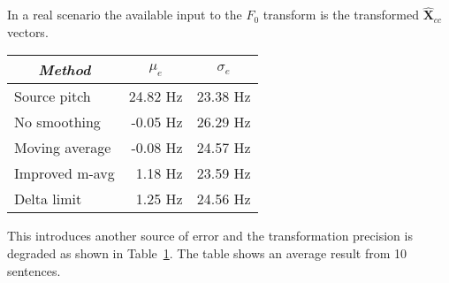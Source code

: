 In a real scenario the available input to the $F_0$ transform is the transformed $\mathbf{\hat{X}}_{cc}$ vectors. 
\begin{table}[htbp]
	\begin{center}
		\label{tab:pitch_pred_transformed_input}	
		\begin{tabular}{lrr}
			\toprule
			\multicolumn{1}{c}{\emph{Method}} & \multicolumn{1}{c}{$\mu_e$} & \multicolumn{1}{c}{$\sigma_e$}\\
			\midrule
			Source pitch & 24.82 Hz & 23.38 Hz\\
			No smoothing & -0.05 Hz  & 26.29 Hz\\
			Moving average & -0.08 Hz  & 24.57 Hz\\
			Improved m-avg & 1.18 Hz & 23.59 Hz\\
			Delta limit & 1.25 Hz & 24.56 Hz \\
			\bottomrule			
		\end{tabular}		
	\end{center}
\end{table}
This introduces another source of error and the transformation precision is degraded as shown in Table~\ref{tab:pitch_pred_transformed_input}. The table shows an average result from 10 sentences.

